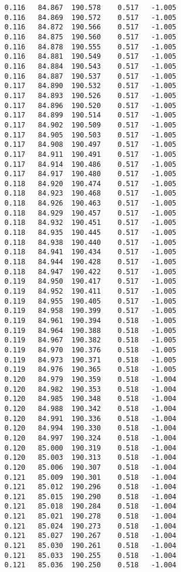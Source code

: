 \begin{verbatim}
   0.116   84.867  190.578    0.517   -1.005
   0.116   84.869  190.572    0.517   -1.005
   0.116   84.872  190.566    0.517   -1.005
   0.116   84.875  190.560    0.517   -1.005
   0.116   84.878  190.555    0.517   -1.005
   0.116   84.881  190.549    0.517   -1.005
   0.116   84.884  190.543    0.517   -1.005
   0.116   84.887  190.537    0.517   -1.005
   0.117   84.890  190.532    0.517   -1.005
   0.117   84.893  190.526    0.517   -1.005
   0.117   84.896  190.520    0.517   -1.005
   0.117   84.899  190.514    0.517   -1.005
   0.117   84.902  190.509    0.517   -1.005
   0.117   84.905  190.503    0.517   -1.005
   0.117   84.908  190.497    0.517   -1.005
   0.117   84.911  190.491    0.517   -1.005
   0.117   84.914  190.486    0.517   -1.005
   0.117   84.917  190.480    0.517   -1.005
   0.118   84.920  190.474    0.517   -1.005
   0.118   84.923  190.468    0.517   -1.005
   0.118   84.926  190.463    0.517   -1.005
   0.118   84.929  190.457    0.517   -1.005
   0.118   84.932  190.451    0.517   -1.005
   0.118   84.935  190.445    0.517   -1.005
   0.118   84.938  190.440    0.517   -1.005
   0.118   84.941  190.434    0.517   -1.005
   0.118   84.944  190.428    0.517   -1.005
   0.118   84.947  190.422    0.517   -1.005
   0.119   84.950  190.417    0.517   -1.005
   0.119   84.952  190.411    0.517   -1.005
   0.119   84.955  190.405    0.517   -1.005
   0.119   84.958  190.399    0.517   -1.005
   0.119   84.961  190.394    0.518   -1.005
   0.119   84.964  190.388    0.518   -1.005
   0.119   84.967  190.382    0.518   -1.005
   0.119   84.970  190.376    0.518   -1.005
   0.119   84.973  190.371    0.518   -1.005
   0.119   84.976  190.365    0.518   -1.005
   0.120   84.979  190.359    0.518   -1.004
   0.120   84.982  190.353    0.518   -1.004
   0.120   84.985  190.348    0.518   -1.004
   0.120   84.988  190.342    0.518   -1.004
   0.120   84.991  190.336    0.518   -1.004
   0.120   84.994  190.330    0.518   -1.004
   0.120   84.997  190.324    0.518   -1.004
   0.120   85.000  190.319    0.518   -1.004
   0.120   85.003  190.313    0.518   -1.004
   0.120   85.006  190.307    0.518   -1.004
   0.121   85.009  190.301    0.518   -1.004
   0.121   85.012  190.296    0.518   -1.004
   0.121   85.015  190.290    0.518   -1.004
   0.121   85.018  190.284    0.518   -1.004
   0.121   85.021  190.278    0.518   -1.004
   0.121   85.024  190.273    0.518   -1.004
   0.121   85.027  190.267    0.518   -1.004
   0.121   85.030  190.261    0.518   -1.004
   0.121   85.033  190.255    0.518   -1.004
   0.121   85.036  190.250    0.518   -1.004

\end{verbatim}
